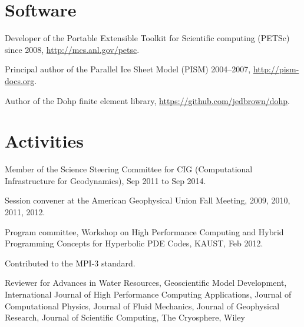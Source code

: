 \documentclass[10pt,letterpaper]{article}
\renewenvironment{itemize}{
  \begin{list}{}{
    \setlength{\leftmargin}{1.5em}
    \setlength{\itemsep}{0.25em}
    \setlength{\parskip}{0pt}
    \setlength{\parsep}{0.25em}
  }
}{
  \end{list}
}
\begin{document}
\section*{Software}
\begin{itemize}
\item Developer of the Portable Extensible Toolkit for Scientific computing (PETSc) since 2008, \url{http://mcs.anl.gov/petsc}.
\item Principal author of the Parallel Ice Sheet Model (PISM) 2004--2007, \url{http://pism-docs.org}.
\item Author of the Dohp finite element library, \url{https://github.com/jedbrown/dohp}.
\end{itemize}

\section*{Activities}
\begin{itemize}
\item Member of the Science Steering Committee for CIG (Computational Infrastructure for Geodynamics), Sep 2011 to Sep 2014.
\item Session convener at the American Geophysical Union Fall Meeting, 2009, 2010, 2011, 2012.
\item Program committee, Workshop on High Performance Computing and Hybrid Programming Concepts for Hyperbolic PDE Codes, KAUST, Feb 2012.
\item Contributed to the MPI-3 standard.
\item Reviewer for
  Advances in Water Resources,
  Geoscientific Model Development,
  International Journal of High Performance Computing Applications,
  Journal of Computational Physics,
  Journal of Fluid Mechanics,
  Journal of Geophysical Research,
  Journal of Scientific Computing,
  The Cryosphere,
  Wiley
\end{itemize}

\end{document}
